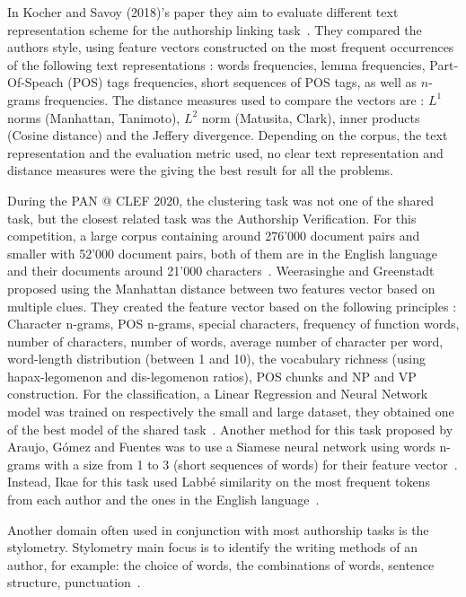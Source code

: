In Kocher and Savoy (2018)'s paper they aim to evaluate different text representation scheme for the authorship linking task~\cite{kocher_linking}.
They compared the authors style, using feature vectors constructed on the most frequent occurrences of the following text representations : words frequencies, lemma frequencies, Part-Of-Speach (POS) tags frequencies, short sequences of POS tags, as well as $n$-grams frequencies.
The distance measures used to compare the vectors are : $L^1$ norms (Manhattan, Tanimoto), $L^2$ norm (Matusita, Clark), inner products (Cosine distance) and the Jeffery divergence.
Depending on the corpus, the text representation and the evaluation metric used, no clear text representation and distance measures were the giving the best result for all the problems.

During the PAN @ CLEF 2020, the clustering task was not one of the shared task, but the closest related task was the Authorship Verification.
For this competition, a large corpus containing around 276'000 document pairs and smaller with 52'000 document pairs, both of them are in the English language and their documents around 21'000 characters~\cite{overview_pan20}.
Weerasinghe and Greenstadt proposed using the Manhattan distance between two features vector based on multiple clues.
They created the feature vector based on the following principles : Character n-grams, POS n-grams, special characters, frequency of function words, number of characters, number of words, average number of character per word, word-length distribution (between 1 and 10), the vocabulary richness (using hapax-legomenon and dis-legomenon ratios), POS chunks and NP and VP construction.
For the classification, a Linear Regression and Neural Network model was trained on respectively the small and large dataset, they obtained one of the best  model of the shared task~\cite{feature_vector_pan20}.
Another method for this task proposed by Araujo, Gómez and Fuentes was to use a Siamese neural network using words n-grams with a size from 1 to 3 (short sequences of words) for their feature vector~\cite{siamese_network_pan20}.
Instead, Ikae for this task used Labbé similarity on the most frequent tokens from each author and the ones in the English language~\cite{unine_pan20_verif}.

Another domain often used in conjunction with most authorship tasks is the stylometry.
Stylometry main focus is to identify the writing methods of an author, for example: the choice of words, the combinations of words, sentence structure, punctuation~\cite{savoy_stylo}.
